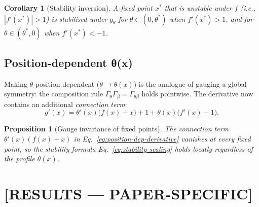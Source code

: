 \documentclass[aps,pre,twocolumn,superscriptaddress,nofootinbib,longbibliography]{revtex4-2}
\newcommand{\param}{\theta}                        %
\newcommand{\paramx}{\theta(x)}                    %
\newcommand{\optparam}{\theta^{*}}                 %
\newcommand{\transform}{g_{\param}}                %
\newcommand{\FP}{x^{*}}
\theoremstyle{plain}
\newtheorem{proposition}[theorem]{Proposition}
\newtheorem{corollary}[theorem]{Corollary}
\theoremstyle{definition}
\theoremstyle{remark}
\begin{document}
\begin{corollary}[Stability inversion]
\label{cor:inversion}
A fixed point $\FP$ that is unstable under $f$
(i.e., $|f'(\FP)| > 1$) is stabilised under $\transform$
for $\param \in (0, \optparam)$ when $f'(\FP) > 1$, and for
$\param \in (\optparam, 0)$ when $f'(\FP) < -1$.
\end{corollary}

\subsection{Position-dependent θ(x)}
\label{ssec:position-dep}

Making $\param$ position-dependent ($\param \to \paramx$) is the
analogue of gauging a global symmetry: the composition rule
$\Gamma_\param \Gamma_\beta = \Gamma_{\param\beta}$ holds
pointwise.  The derivative now contains an additional
\emph{connection term}:
%
\begin{equation}
  g'(x) = \theta'(x)\bigl(f(x) - x\bigr)
           + 1 + \paramx\bigl(f'(x) - 1\bigr).
  \label{eq:position-dep-derivative}
\end{equation}
%
\begin{proposition}[Gauge invariance of fixed points]
\label{prop:gauge-invariance}
The connection term $\theta'(x)(f(x)-x)$ in
Eq.~\eqref{eq:position-dep-derivative} vanishes at every fixed
point, so the stability formula Eq.~\eqref{eq:stability-scaling}
holds locally regardless of the profile $\paramx$.
\end{proposition}

\section{[RESULTS — PAPER-SPECIFIC]}
\label{sec:results}

\end{document}
